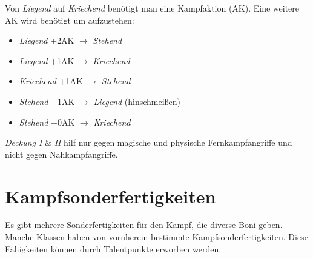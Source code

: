 Von \textit{Liegend} auf \textit{Kriechend} benötigt man eine Kampfaktion (AK). Eine weitere AK wird benötigt um aufzustehen: 

\begin{itemize}
\item \textit{Liegend} +2AK $\rightarrow$ \textit{Stehend}
\item \textit{Liegend} +1AK $\rightarrow$ \textit{Kriechend}
\item \textit{Kriechend} +1AK $\rightarrow$ \textit{Stehend}
\item \textit{Stehend} +1AK $\rightarrow$ \textit{Liegend} (hinschmeißen)
\item \textit{Stehend} +0AK $\rightarrow$ \textit{Kriechend}
\end{itemize}

\textit{Deckung I} \& \textit{II} hilf nur gegen magische und physische Fernkampfangriffe und nicht gegen Nahkampfangriffe.


\section{Kampfsonderfertigkeiten}
Es gibt mehrere Sonderfertigkeiten für den Kampf, die diverse Boni geben. Manche Klassen haben von vornherein bestimmte Kampfsonderfertigkeiten. Diese Fähigkeiten können durch Talentpunkte erworben werden.

